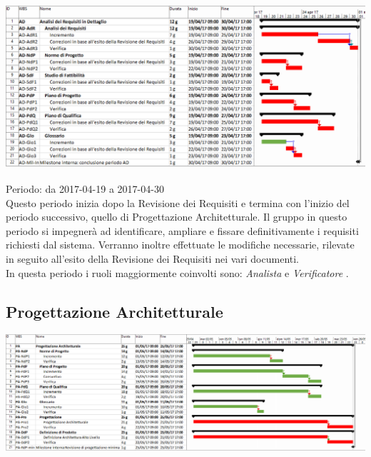 \begin{center}
  \includegraphics[scale=0.3]{img/2-AD.png}
\end{center}

Periodo: da 2017-04-19 a 2017-04-30 \\
Questo periodo inizia dopo la Revisione dei Requisiti e termina con l'inizio del periodo
successivo, quello di Progettazione Architetturale.
Il gruppo in questo periodo si impegnerà ad identificare, ampliare e fissare definitivamente i requisiti richiesti dal sistema.
Verranno inoltre effettuate le modifiche necessarie, rilevate in seguito all'esito della Revisione dei Requisiti nei vari documenti. \\
In questa periodo i ruoli maggiormente coinvolti sono:  \emph{Analista}  e  \emph{Verificatore} .

\subsection{Progettazione Architetturale}

\begin{center}
  \includegraphics[scale=0.25]{img/3-PA.png}
\end{center}


